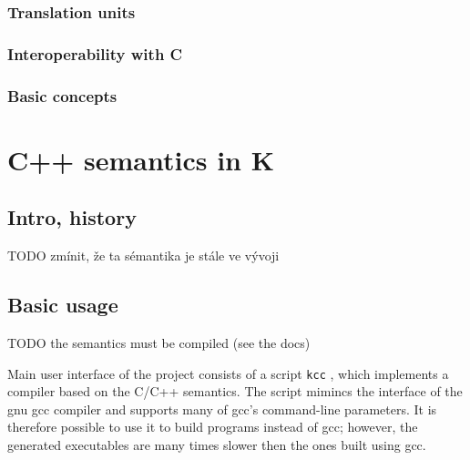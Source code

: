 \documentclass{fithesis3}
\newcommand{\kcc}{\texttt{kcc} }
\begin{document}
\subsection{Translation units}

\subsection{Interoperability with C}

\subsection{Basic concepts}


\chapter{C++ semantics in K}




\section{Intro, history}
TODO zmínit, že ta sémantika je stále ve vývoji

\section{Basic usage}

TODO the semantics must be compiled (see the docs)

Main user interface of the project consists of a script \kcc, which implements a compiler based on the C/C++ semantics. The script mimincs the interface of the gnu gcc compiler and supports many of gcc's command-line parameters. It is therefore possible to use it to build programs instead of gcc; however, the generated executables are many times slower then the ones built using gcc.
\end{document}
